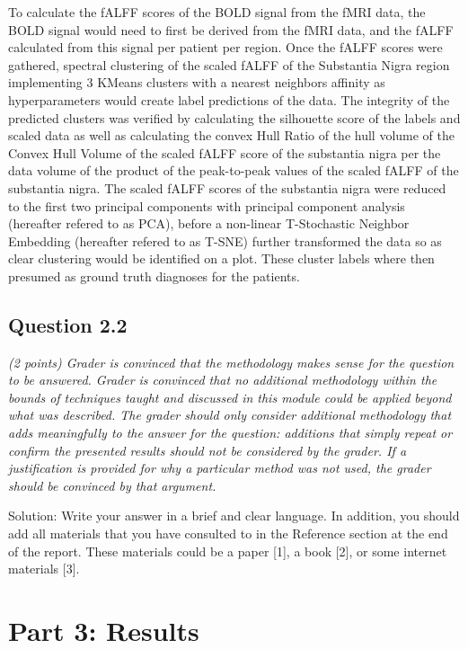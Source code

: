 \documentclass[12pt]{article}
\begin{document}
To calculate the fALFF scores of the BOLD signal from the fMRI data, the BOLD signal would need to first be derived from the fMRI data, and the fALFF calculated from this signal per patient per region. Once the fALFF scores were gathered, spectral clustering of the scaled fALFF of the Substantia Nigra region implementing 3 KMeans clusters with a nearest neighbors affinity as hyperparameters would create label predictions of the data. The integrity of the predicted clusters was verified by calculating the silhouette score of the labels and scaled data as well as calculating the convex Hull Ratio of the hull volume of the Convex Hull Volume of the scaled fALFF score of the substantia nigra per the data volume of the product of the peak-to-peak values of the scaled fALFF of the substantia nigra. The scaled fALFF scores of the substantia nigra were reduced to the first two principal components with principal component analysis (hereafter refered to as PCA), before a non-linear T-Stochastic Neighbor Embedding (hereafter refered to as T-SNE) further transformed the data so as clear clustering would be identified on a plot. These cluster labels where then presumed as ground truth diagnoses for the patients. 




\subsection{Question 2.2}
\textit{(2 points) Grader is convinced that the methodology makes sense for the question to be answered. Grader is convinced that no additional methodology within the bounds of techniques taught and discussed in this module could be applied beyond what was described. The grader should only consider additional methodology that adds meaningfully to the answer for the question: additions that simply repeat or confirm the presented results should not be considered by the grader. If a justification is provided for why a particular method was not used, the grader should be convinced by that argument. }

Solution: Write your answer in a brief and clear language. In addition, you should add all materials that you have consulted to in the Reference section at the end of the report. These materials could be a paper [1], a book [2], or some internet materials [3].

\section{Part 3: Results}
\end{document}
